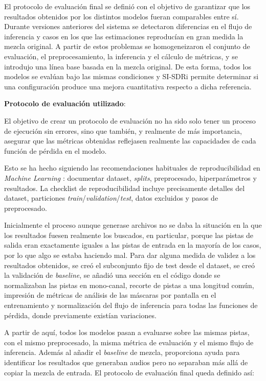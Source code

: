 El protocolo de evaluación final se definió con el objetivo de garantizar que los resultados obtenidos por los distintos modelos fueran comparables entre sí. Durante versiones anteriores del sistema se detectaron diferencias en el flujo de inferencia y casos en los que las estimaciones reproducían en gran medida la mezcla original. A partir de estos problemas se homogeneizaron el conjunto de evaluación, el preprocesamiento, la inferencia y el cálculo de métricas, y se introdujo una línea base basada en la mezcla original. De esta forma, todos los modelos se evalúan bajo las mismas condiciones y SI-SDRi permite determinar si una configuración produce una mejora cuantitativa respecto a dicha referencia.

\textbf{Protocolo de evaluación utilizado}:

El objetivo de crear un protocolo de evaluación no ha sido solo tener un proceso de ejecución sin errores, sino que también, y realmente de más importancia, asegurar que las métricas obtenidas reflejasen realmente las capacidades de cada función de pérdida en el modelo.

Esto se ha hecho siguiendo las recomendaciones habituales de reproducibilidad en \textit{Machine Learning} \cite{MachineLearningPaperReproducibilityChecklist}:
documentar dataset, \textit{splits}, preprocesado, hiperparámetros y resultados. La checklist de reproducibilidad incluye precisamente detalles del dataset,
particiones \textit{train}/\textit{validation}/\textit{test}, datos excluidos y pasos de preprocesado.

Inicialmente el proceso aunque generase archivos no se daba la situación en la que los resultados fuesen realmente los buscados, en particular, porque las pistas de salida eran exactamente iguales a las pistas de entrada en la mayoría de los casos, por lo que algo se estaba haciendo mal.
Para dar alguna medida de validez a los resultados obtenidos, se creó el subconjunto fijo de test desde el dataset, se creó la validación de \textit{baseline}, se añadió una sección en el código donde se normalizaban las pistas en mono-canal, recorte de pistas a una longitud común, impresión de métricas de análisis de las máscaras por pantalla en el entrenamiento y normalización del flujo de inferencia para todas las funciones de pérdida, donde previamente existían variaciones.

A partir de aquí, todos los modelos pasan a evaluarse sobre las mismas pistas, con el mismo preprocesado, la misma métrica de evaluación y el mismo flujo de inferencia. Además al añadir el \textit{baseline} de mezcla, proporciona ayuda para identificar los resultados que generaban audios pero no separaban más allá de copiar la mezcla de entrada. El protocolo de evaluación final queda definido así:

